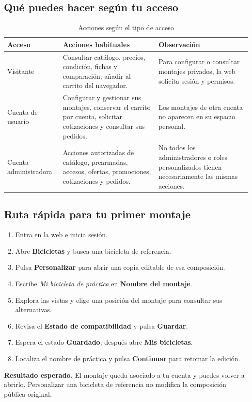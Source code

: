 \documentclass[12pt,letterpaper]{article}
\newenvironment{tabla}{\begingroup\singlespacing\small\setlength{\tabcolsep}{5pt}\renewcommand{\arraystretch}{1.25}}{\endgroup}
\newcommand{\control}[1]{\textbf{#1}}
\newcommand{\resultado}[1]{\par\noindent\textbf{Resultado esperado.} #1\par}
\begin{document}
\subsection{Qué puedes hacer según tu acceso}
\begin{table}[H]\caption{Acciones según el tipo de acceso}\label{tab:accesos}\begin{tabla}\begin{tabularx}{\textwidth}{L{3cm}XX}\toprule
Acceso & Acciones habituales & Observación\\\midrule
Visitante & Consultar catálogo, precios, condición, fichas y comparación; añadir al carrito del navegador. & Para configurar o consultar montajes privados, la web solicita sesión y permisos.\\
Cuenta de usuario & Configurar y gestionar sus montajes, conservar el carrito por cuenta, solicitar cotizaciones y consultar sus pedidos. & Los montajes de otra cuenta no aparecen en su espacio personal.\\
Cuenta administradora & Acciones autorizadas de catálogo, prearmadas, accesos, ofertas, promociones, cotizaciones y pedidos. & No todos los administradores o roles personalizados tienen necesariamente las mismas acciones.\\\bottomrule
\end{tabularx}\end{tabla}\end{table}

\subsection{Ruta rápida para tu primer montaje}\label{sec:rapida}
\begin{enumerate}
\item Entra en la web e inicia sesión.
\item Abre \control{Bicicletas} y busca una bicicleta de referencia.
\item Pulsa \control{Personalizar} para abrir una copia editable de esa composición.
\item Escribe \textit{Mi bicicleta de práctica} en \control{Nombre del montaje}.
\item Explora las vistas y elige una posición del montaje para consultar sus alternativas.
\item Revisa el \control{Estado de compatibilidad} y pulsa \control{Guardar}.
\item Espera el estado \control{Guardado}; después abre \control{Mis bicicletas}.
\item Localiza el nombre de práctica y pulsa \control{Continuar} para retomar la edición.
\end{enumerate}
\resultado{El montaje queda asociado a tu cuenta y puedes volver a abrirlo. Personalizar una bicicleta de referencia no modifica la composición pública original.}
\clearpage
\end{document}
